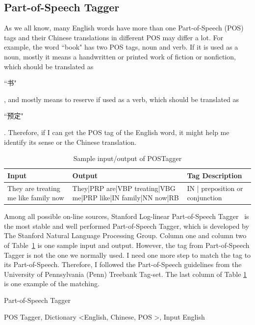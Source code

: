 \begin{CJK}{UTF8}{gbsn}
\subsection{Part-of-Speech Tagger}
As we all know, many English words have more than one Part-of-Speech (POS) tags and their Chinese translations in different POS may differ a lot. For example, the word ``book" has two POS tags, noun and verb. If it is used as a noun, mostly it means a handwritten or printed work of fiction or nonfiction, which should be translated as \begin{CJK}{UTF8}{gbsn}``书"\end{CJK}, and mostly means to reserve if used as a verb, which should be translated as \begin{CJK}{UTF8}{gbsn}``预定"\end{CJK}. Therefore, if I can get the POS tag of the English word, it might help me identify its sense or the Chinese translation.

\begin{table}[ht]
    \caption{Sample input/output of POSTagger}
    \label{table:part_of_speech}
    \begin{center}
    \begin{tabular}{| p{1.5cm} | p{2.5cm} | p{2.2cm} |}
        \hline
        Input & Output & Tag Description \\
        \hline
        They are treating me like family now & They|PRP are|VBP treating|VBG me|PRP like|IN family|NN now|RB & IN | preposition or conjunction\\
        \hline
    \end{tabular}
    \end{center}
\end{table}

Among all possible on-line sources, Stanford Log-linear Part-of-Speech Tagger~\cite{Toutanova2003} is the most stable and well performed Part-of-Speech Tagger, which is developed by The Stanford Natural Language Processing Group. Column one and column two of Table~\ref{table:part_of_speech} is one sample input and output. However, the tag from Part-of-Speech Tagger is not the one we normally used. I need one more step to match the tag to its Part-of-Speech. Therefore, I followed the Part-of-Speech guidelines from the University of Pennsylvania (Penn) Treebank Tag-set. The last column of Table \ref{table:part_of_speech} is one example of the matching.

\begin{algorithm}[ht]
\caption{Part-of-Speech Tagger}
\label{algorithm:wsd_1}
\begin{algorithmic}
\REQUIRE POS Tagger, Dictionary \textless English, Chinese, POS \textgreater, Input English


\end{algorithmic}
\end{algorithm}
\end{CJK}
